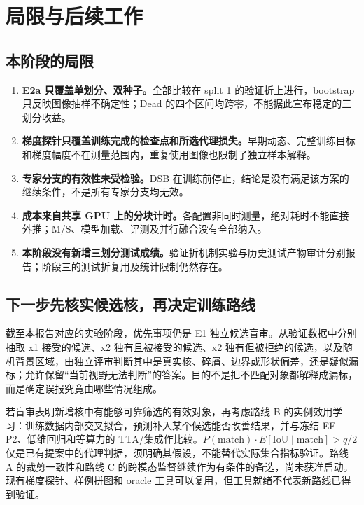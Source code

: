 \documentclass[11pt,a4paper,UTF8,fontset=fandol]{ctexart}
\begin{document}
\section{局限与后续工作}

\subsection{本阶段的局限}

\begin{enumerate}
\item \textbf{E2a 只覆盖单划分、双种子。}全部比较在 split 1 的验证折上进行，bootstrap 只反映图像抽样不确定性；Dead 的四个区间均跨零，不能据此宣布稳定的三划分收益。
\item \textbf{梯度探针只覆盖训练完成的检查点和所选代理损失。}早期动态、完整训练目标和梯度幅度不在测量范围内，重复使用图像也限制了独立样本解释。
\item \textbf{专家分支的有效性未受检验。}DSB 在训练前停止，结论是没有满足该方案的继续条件，不是所有专家分支均无效。
\item \textbf{成本来自共享 GPU 上的分块计时。}各配置非同时测量，绝对耗时不能直接外推；M/S、模型加载、评测及并行融合没有全部纳入。
\item \textbf{本阶段没有新增三划分测试成绩。}验证折机制实验与历史测试产物审计分别报告；阶段三的测试折复用及统计限制仍然存在。
\end{enumerate}

\subsection{下一步先核实候选核，再决定训练路线}

截至本报告对应的实验阶段，优先事项仍是 E1 独立候选盲审\cite{next}。从验证数据中分别抽取 x1 接受的候选、x2 独有且被接受的候选、x2 独有但被拒绝的候选，以及随机背景区域，由独立评审判断其中是真实核、碎屑、边界或形状偏差，还是疑似漏标；允许保留“当前视野无法判断”的答案。目的不是把不匹配对象都解释成漏标，而是确定误报究竟由哪些情况组成。

若盲审表明新增核中有能够可靠筛选的有效对象，再考虑路线 B 的实例效用学习：训练数据内部交叉拟合，预测补入某个候选能否改善结果，并与冻结 EF-P2、低维回归和等算力的 TTA/集成作比较。$P(\mathrm{match})\cdot E[\mathrm{IoU}\mid\mathrm{match}]>q/2$ 仅是已有提案中的代理判据，须明确其假设，不能替代实际集合指标验证。路线 A 的裁剪一致性和路线 C 的跨模态监督继续作为有条件的备选，尚未获准启动。现有梯度探针、样例拼图和 oracle 工具可以复用，但工具就绪不代表新路线已得到验证。
\end{document}
